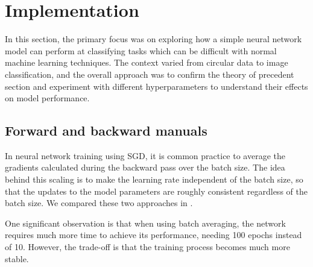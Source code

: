 \section{Implementation}

In this section, the primary focus was on exploring how a simple neural network model can perform at classifying tasks which can be difficult with normal machine learning techniques. The context varied from circular data to image classification, and the overall approach was to confirm the theory of precedent section and experiment with different hyperparameters to understand their effects on model performance.

\subsection{Forward and backward manuals}
In neural network training using SGD, it is common practice to average the gradients calculated during the backward pass over the batch size. The idea behind this scaling is to make the learning rate independent of the batch size, so that the updates to the model parameters are roughly consistent regardless of the batch size. We compared these two approaches in .

One significant observation is that when using batch averaging, the network requires much more time to achieve its performance, needing 100 epochs instead of 10. However, the trade-off is that the training process becomes much more stable.

